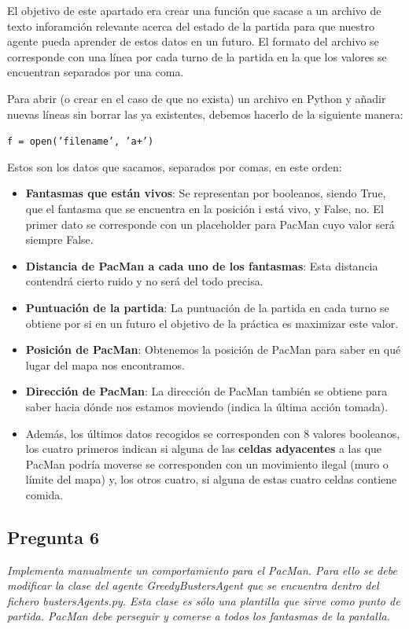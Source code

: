 \documentclass[12pt]{article}
\begin{document}
El objetivo de este apartado era crear una función que sacase a un archivo de
texto inforamción relevante acerca del estado de la partida para que nuestro
agente pueda aprender de estos datos en un futuro. El formato del archivo se
corresponde con una línea por cada turno de la partida en la que los valores
se encuentran separados por una coma.

Para abrir (o crear en el caso de que no exista) un archivo en Python y añadir
nuevas líneas sin borrar las ya existentes, debemos hacerlo de la siguiente
manera:

\centerline{\texttt{f = open('filename', 'a+')}}

Estos son los datos que sacamos, separados por comas, en este orden:
\begin{itemize}
    \item \textbf{Fantasmas que están vivos}: Se representan por booleanos,
    siendo True, que el fantasma que se encuentra en la posición i está vivo, y
    False, no. El primer dato se corresponde con un placeholder para PacMan
    cuyo valor será siempre False.
    \item \textbf{Distancia de PacMan a cada uno de los fantasmas}: Esta
    distancia contendrá cierto ruido y no será del todo precisa.
    \item \textbf{Puntuación de la partida}: La puntuación de la partida en
    cada turno se obtiene por si en un futuro el objetivo de la práctica es
    maximizar este valor.
    \item \textbf{Posición de PacMan}: Obtenemos la posición de PacMan para
    saber en qué lugar del mapa nos encontramos.
    \item \textbf{Dirección de PacMan}: La dirección de PacMan también se
    obtiene para saber hacia dónde nos estamos moviendo (indica la última
    acción tomada).
    \item Además, los últimos datos recogidos se corresponden con 8 valores
    booleanos, los cuatro primeros indican si alguna de las \textbf{celdas
    adyacentes} a las que PacMan podría moverse se corresponden con un
    movimiento ilegal (muro o límite del mapa) y, los otros cuatro, si alguna
    de estas cuatro celdas contiene comida.
\end{itemize}


\newpage
\begin{center}
\section{Pregunta 6}

\emph{Implementa manualmente un comportamiento para el PacMan. Para ello se
debe modificar la clase del agente GreedyBustersAgent que se encuentra dentro
del fichero bustersAgents.py. Esta clase es sólo una plantilla que sirve como
punto de partida. PacMan debe perseguir y comerse a todos los fantasmas de la
pantalla.}
\end{center}
\end{document}
